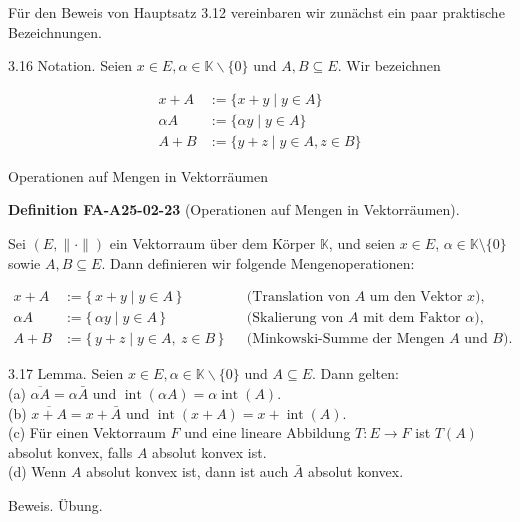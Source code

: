 \documentclass[10pt, letterpaper]{article}
\newcommand{\CustomHeading}[3]{%
  \par\medskip\noindent%
  \textbf{#1 #2} \textnormal{(#3)}.\enskip%
}
\newenvironment{DEF}[2]{\begin{unitbox}\CustomHeading{Definition}{#1}{#2}}{\end{unitbox}}
\begin{document}
Für den Beweis von Hauptsatz 3.12 vereinbaren wir zunächst ein paar praktische Bezeichnungen.


3.16 Notation. Seien $x \in E, \alpha \in \mathbb{K} \backslash\{0\}$ und $A, B \subseteq E$. Wir bezeichnen

$$
\begin{aligned}
x+A & :=\{x+y \mid y \in A\} \\
\alpha A & :=\{\alpha y \mid y \in A\} \\
A+B & :=\{y+z \mid y \in A, z \in B\}
\end{aligned}
$$


Operationen auf Mengen in Vektorräumen

\begin{DEF}{FA-A25-02-23}{Operationen auf Mengen in Vektorräumen}
Sei $(E,\|\cdot\|)$ ein Vektorraum über dem Körper $\mathbb{K}$, 
und seien $x\in E$, $\alpha\in\mathbb{K}\setminus\{0\}$ sowie $A,B\subseteq E$.  
Dann definieren wir folgende Mengenoperationen:

\[
\begin{aligned}
x + A &:= \{\,x + y \mid y \in A\,\}
&&\text{(Translation von $A$ um den Vektor $x$),}\\[0.5em]
\alpha A &:= \{\,\alpha y \mid y \in A\,\}
&&\text{(Skalierung von $A$ mit dem Faktor $\alpha$),}\\[0.5em]
A + B &:= \{\,y + z \mid y \in A,\ z \in B\,\}
&&\text{(Minkowski-Summe der Mengen $A$ und $B$).}
\end{aligned}
\]
\end{DEF}



3.17 Lemma. Seien $x \in E, \alpha \in \mathbb{K} \backslash\{0\}$ und $A \subseteq E$. Dann gelten:\\
(a) $\overline{\alpha A}=\alpha \bar{A}$ und $\operatorname{int}(\alpha A)=\alpha \operatorname{int}(A)$.\\
(b) $\overline{x+A}=x+\bar{A}$ und $\operatorname{int}(x+A)=x+\operatorname{int}(A)$.\\
(c) Für einen Vektorraum $F$ und eine lineare Abbildung $T: E \rightarrow F$ ist $T(A)$ absolut konvex, falls $A$ absolut konvex ist.\\
(d) Wenn $A$ absolut konvex ist, dann ist auch $\bar{A}$ absolut konvex.

Beweis. Übung.\\
\end{document}

